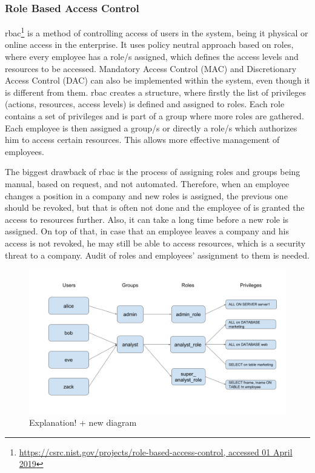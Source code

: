 \subsubsection{Role Based Access Control} \label{RBAC_SOTA}

\acrfull{rbac}\footnote{\url{https://csrc.nist.gov/projects/role-based-access-control, accessed 01 April 2019}} is a method of controlling access of users in the system, being it physical or online access in the enterprise. It uses policy neutral approach based on roles, where every employee has a role/s assigned, which defines the access levels and resources to be accessed. Mandatory Access Control (MAC) and Discretionary Access Control (DAC) can also be implemented within the system, even though it is different from them. \acrshort{rbac} creates a structure, where firstly the list of privileges (actions, resources, access levels) is defined and assigned to roles. Each role contains a set of privileges and is part of a group where more roles are gathered. Each employee is then assigned a group/s or directly a role/s which authorizes him to access certain resources. This allows more effective management of employees.

The biggest drawback of \acrshort{rbac} is the process of assigning roles and groups being manual, based on request, and not automated. Therefore, when an employee changes a position in a company and new roles is assigned, the previous one should be revoked, but that is often not done and the employee of is granted the access to resources further. Also, it can take a long time before a new role is assigned. On top of that, in case that an employee leaves a company and his access is not revoked, he may still be able to access resources, which is a security threat to a company. Audit of roles and employees’ assignment to them is needed.

\begin{figure}[ht]
    \centering
    \includegraphics[width=.95\textwidth]{00images/RBAC}
    \caption{Explanation! + new diagram}
    \label{fig:RBAC_diagram_sota}
\end{figure}